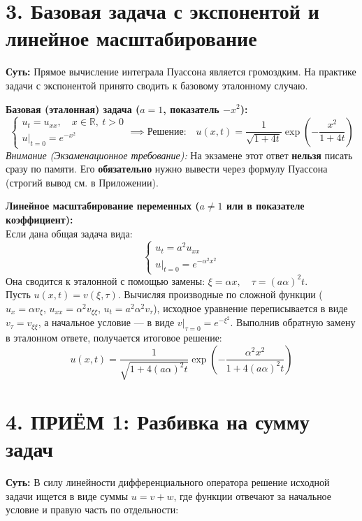 \section{3. Базовая задача с экспонентой и линейное масштабирование}
\textbf{Суть:} Прямое вычисление интеграла Пуассона является громоздким. На практике задачи с экспонентой принято сводить к базовому эталонному случаю.

\vspace{0.2cm}
\noindent\textbf{Базовая (эталонная) задача ($a=1$, показатель $-x^2$):} 
\[
\begin{cases} 
u_t = u_{xx}, \quad x \in \mathbb{R}, \ t>0 \\ 
u|_{t=0} = e^{-x^2}
\end{cases} 
\implies 
\text{Решение:} \quad u(x,t) = \frac{1}{\sqrt{1+4t}} \exp\left(-\frac{x^2}{1+4t}\right)
\]
\textit{Внимание (Экзаменационное требование):} На экзамене этот ответ \textbf{нельзя} писать сразу по памяти. Его \textbf{обязательно} нужно вывести через формулу Пуассона (строгий вывод см. в Приложении).

\vspace{0.2cm}
\noindent\textbf{Линейное масштабирование переменных ($a \neq 1$ или в показателе коэффициент):} \\
Если дана общая задача вида:
\[
\begin{cases} 
u_t = a^2 u_{xx} \\ 
u|_{t=0} = e^{-\alpha^2 x^2}
\end{cases} 
\]
Она сводится к эталонной с помощью замены: \textbf{$\xi = \alpha x, \quad \tau = (a\alpha)^2 t$}. \\
Пусть $u(x,t) = v(\xi, \tau)$. Вычисляя производные по сложной функции ($u_x = \alpha v_\xi$, $u_{xx} = \alpha^2 v_{\xi\xi}$, $u_t = a^2\alpha^2 v_\tau$), исходное уравнение переписывается в виде $v_\tau = v_{\xi\xi}$, а начальное условие — в виде $v|_{\tau=0} = e^{-\xi^2}$. Выполнив обратную замену в эталонном ответе, получается итоговое решение:
\[
u(x,t) = \frac{1}{\sqrt{1+4(a\alpha)^2 t}} \exp\left(-\frac{\alpha^2 x^2}{1+4(a\alpha)^2 t}\right)
\]

\section{4. ПРИЁМ 1: Разбивка на сумму задач}
\textbf{Суть:} В силу линейности дифференциального оператора решение исходной задачи ищется в виде суммы $u = v + w$, где функции отвечают за начальное условие и правую часть по отдельности:

